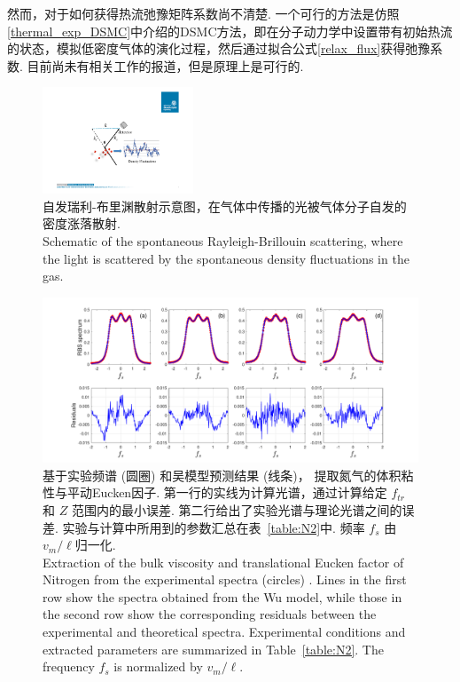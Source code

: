 然而，对于如何获得热流弛豫矩阵系数尚不清楚. 一个可行的方法是仿照\ref{thermal_exp_DSMC}中介绍的DSMC方法，即在分子动力学中设置带有初始热流的状态，模拟低密度气体的演化过程，然后通过拟合公式\eqref{relax_flux}获得弛豫系数. 目前尚未有相关工作的报道，但是原理上是可行的.

\begin{figure}[t]
	\centering
	\includegraphics[width=0.4\textwidth]{Fig/SRBS_demo}
	\caption{ 自发瑞利-布里渊散射示意图\cite{Wu2020JFM}，在气体中传播的光被气体分子自发的密度涨落散射.\\
		Schematic of the spontaneous Rayleigh-Brillouin scattering\cite{Wu2020JFM}, where the light is scattered by the spontaneous density fluctuations in the gas. 
	}
	\label{fig:RBS}
\end{figure}


\begin{figure}[t]
	\centering
	\includegraphics[scale=0.6,viewport=70 10 850 405,clip=true]{Fig/JFM10_Figure8.pdf}
	\caption{ 基于实验频谱 (圆圈) 和吴模型预测结果 (线条)， 提取氮气的体积粘性与平动Eucken因子\cite{Wu2020JFM}. 第一行的实线为计算光谱，通过计算给定 $f_{tr}$ 和 $Z$ 范围内的最小误差. 第二行给出了实验光谱与理论光谱之间的误差. 实验与计算中所用到的参数汇总在表~\ref{table:N2}中. 频率 $f_s$ 由$v_m/\ell$归一化.\\
		Extraction of the bulk viscosity and translational Eucken factor of Nitrogen from the experimental spectra (circles) \cite{Wu2020JFM}. Lines in the first row show the spectra obtained from the Wu model, while those in the second row show the corresponding residuals between the experimental and theoretical spectra. Experimental conditions and extracted parameters are summarized in Table~\ref{table:N2}. The frequency $f_s$ is normalized by $v_m/\ell$.
	}
	\label{fig:N2}
\end{figure}

